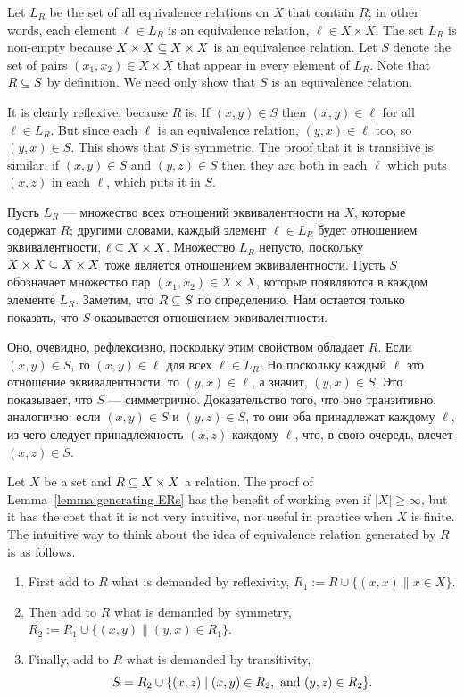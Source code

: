 \documentclass[CT4S-EN-RU]{subfiles}
\begin{document}
\begin{proofENG}
Let $L_R$ be the set of all equivalence relations on $X$ that contain $R$; in other words, each element $\ell\in L_R$ is an equivalence relation, $\ell\in X\times X$. The set $L_R$ is non-empty because $X\times X\ss X\times X$ is an equivalence relation. Let $S$ denote the set of pairs $(x_1,x_2)\in X\times X$ that appear in every element of $L_R$. Note that $R\ss S$ by definition. We need only show that $S$ is an equivalence relation.

It is clearly reflexive, because $R$ is. If $(x,y)\in S$ then $(x,y)\in\ell$ for all $\ell\in L_R$. But since each $\ell$ is an equivalence relation, $(y,x)\in\ell$ too, so $(y,x)\in S$. This shows that $S$ is symmetric. The proof that it is transitive is similar: if $(x,y)\in S$ and $(y,z)\in S$ then they are both in each $\ell$ which puts $(x,z)$ in each $\ell$, which puts it in $S$.
\end{proofENG}

\begin{proofRUS}
Пусть $L_R$ — множество всех отношений эквивалентности на $X$, которые содержат $R$; другими словами, каждый элемент $\ell\in L_R$ будет отношением эквивалентности, $\ell\ss X\times X$. Множество $L_R$ непусто, поскольку $X\times X\ss X\times X$ тоже является отношением эквивалентности. Пусть $S$ обозначает множество пар $(x_1,x_2)\in X\times X$, которые появляются в каждом элементе $L_R$. Заметим, что $R\ss S$ по определению. Нам остается только показать, что $S$ оказывается отношением эквивалентности.

Оно, очевидно, рефлексивно, поскольку этим свойством обладает $R$. Если $(x,y)\in S$, то $(x,y)\in\ell$ для всех $\ell\in L_R$. Но поскольку каждый $\ell$ это отношение эквивалентности, то $(y,x)\in\ell$, а значит, $(y,x)\in S$. Это показывает, что $S$ — симметрично. Доказательство того, что оно транзитивно, аналогично: если $(x,y)\in S$ и $(y,z)\in S$, то они оба принадлежат каждому $\ell$, из чего следует принадлежность $(x,z)$ каждому $\ell$, что, в свою очередь, влечет $(x,z)\in S$.
\end{proofRUS}

\begin{remarkENG}
Let $X$ be a set and $R\ss X\times X$ a relation. The proof of Lemma~\ref{lemma:generating ERs} has the benefit of working even if $|X|\geq\infty$, but it has the cost that it is not very intuitive, nor useful in practice when $X$ is finite. The intuitive way to think about the idea of equivalence relation generated by $R$ is as follows.
\begin{enumerate}
\item First add to $R$ what is demanded by reflexivity, $R_1:=R\cup\{(x,x)\|x\in X\}$.
\item Then add to $R$ what is demanded by symmetry, $R_2:=R_1\cup\{(x,y)\|(y,x)\in R_1\}.$
\item Finally, add to $R$ what is demanded by transitivity, $$S=R_2\cup\{(x,z)\|(x,y)\in R_2, \tn{ and } (y,z)\in R_2\}.$$
\end{enumerate}
\end{remarkENG}
\end{document}

